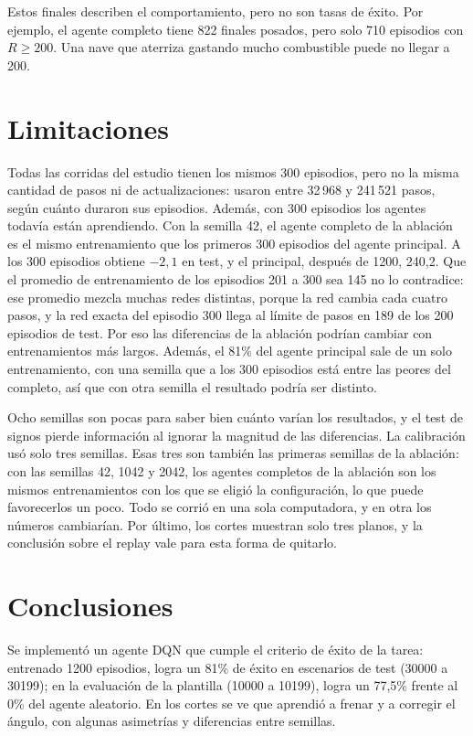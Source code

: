 \documentclass[conference]{IEEEtran}
\begin{document}
Estos finales describen el comportamiento, pero no son tasas de éxito. Por ejemplo, el agente completo tiene 822 finales posados, pero solo 710 episodios con $R\geq200$. Una nave que aterriza gastando mucho combustible puede no llegar a 200.

\balance
\section{Limitaciones}
Todas las corridas del estudio tienen los mismos 300 episodios, pero no la misma cantidad de pasos ni de actualizaciones: usaron entre 32\,968 y 241\,521 pasos, según cuánto duraron sus episodios. Además, con 300 episodios los agentes todavía están aprendiendo. Con la semilla 42, el agente completo de la ablación es el mismo entrenamiento que los primeros 300 episodios del agente principal. A los 300 episodios obtiene $-2{,}1$ en test, y el principal, después de 1200, 240,2. Que el promedio de entrenamiento de los episodios 201 a 300 sea 145 no lo contradice: ese promedio mezcla muchas redes distintas, porque la red cambia cada cuatro pasos, y la red exacta del episodio 300 llega al límite de pasos en 189 de los 200 episodios de test. Por eso las diferencias de la ablación podrían cambiar con entrenamientos más largos. Además, el 81\% del agente principal sale de un solo entrenamiento, con una semilla que a los 300 episodios está entre las peores del completo, así que con otra semilla el resultado podría ser distinto.

Ocho semillas son pocas para saber bien cuánto varían los resultados, y el test de signos pierde información al ignorar la magnitud de las diferencias. La calibración usó solo tres semillas. Esas tres son también las primeras semillas de la ablación: con las semillas 42, 1042 y 2042, los agentes completos de la ablación son los mismos entrenamientos con los que se eligió la configuración, lo que puede favorecerlos un poco. Todo se corrió en una sola computadora, y en otra los números cambiarían. Por último, los cortes muestran solo tres planos, y la conclusión sobre el replay vale para esta forma de quitarlo.

\section{Conclusiones}
Se implementó un agente DQN que cumple el criterio de éxito de la tarea: entrenado 1200 episodios, logra un 81\% de éxito en escenarios de test (30000 a 30199); en la evaluación de la plantilla (10000 a 10199), logra un 77,5\% frente al 0\% del agente aleatorio. En los cortes se ve que aprendió a frenar y a corregir el ángulo, con algunas asimetrías y diferencias entre semillas.
\end{document}
